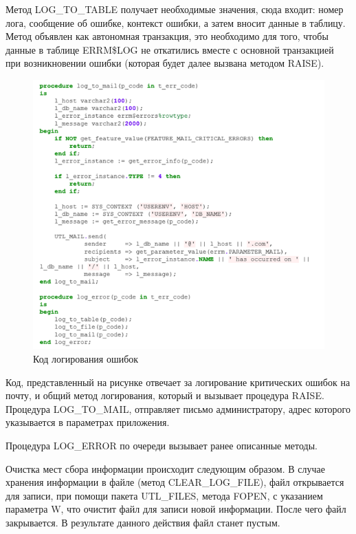 Метод LOG\_TO\_TABLE получает необходимые значения, сюда входит: номер лога, сообщение об ошибке, контекст ошибки, а затем вносит данные в таблицу. Метод объявлен как автономная транзакция, это необходимо для того, чтобы данные в таблице ERRM\$LOG не откатились вместе с основной транзакцией при возникновении ошибки (которая будет далее вызвана методом RAISE).

\begin{figure}[ht!] 
	\center
	\includegraphics [scale=1] {my_folder/img/c3_log_code.png}
	\caption{Код логирования ошибок} 
	\label{fig:c3_log_code}  
\end{figure}
\FloatBarrier

Код, представленный на рисунке  отвечает за логирование критических ошибок на почту, и общий метод логирования, который и вызывает процедура RAISE. Процедура LOG\_TO\_MAIL, отправляет письмо администратору, адрес которого указывается в параметрах приложения. 

Процедура LOG\_ERROR по очереди вызывает ранее описанные методы. 

Очистка мест сбора информации происходит следующим образом. В случае хранения информации в файле (метод CLEAR\_LOG\_FILE), файл открывается для записи, при помощи пакета UTL\_FILES, метода FOPEN, с указанием параметра W, что очистит файл для записи новой информации. После чего файл закрывается. В результате данного действия файл станет пустым. 

